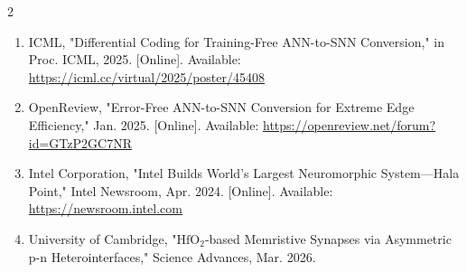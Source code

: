 \begin{multicols}{2}
\begin{justify}
\begin{enumerate}
    \item ICML, "Differential Coding for Training-Free ANN-to-SNN Conversion," in Proc. ICML, 2025.
      [Online]. Available: \url{https://icml.cc/virtual/2025/poster/45408}

    \item OpenReview, "Error-Free ANN-to-SNN Conversion for Extreme Edge Efficiency," Jan. 2025.
      [Online]. Available: \url{https://openreview.net/forum?id=GTzP2GC7NR}

    \item Intel Corporation, "Intel Builds World's Largest Neuromorphic System---Hala Point," Intel
      Newsroom, Apr. 2024. [Online]. Available: \url{https://newsroom.intel.com}

    \item University of Cambridge, "\(\mathrm{HfO_2}\)-based Memristive Synapses via Asymmetric p-n
      Heterointerfaces," Science Advances, Mar. 2026.
  \end{enumerate}
  \end{justify}
\end{multicols}